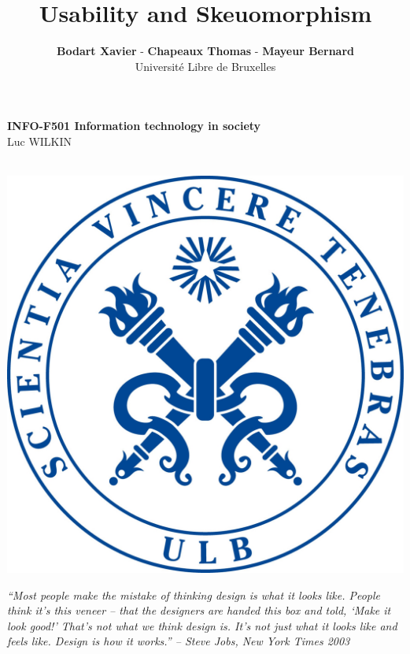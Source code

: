 \documentclass[a4paper,11pt] {article}
\theoremstyle{definition}
\begin{document}
\title{\textbf{Usability and Skeuomorphism}}
\author{\textbf{Bodart Xavier} - \textbf{Chapeaux Thomas} - \textbf{Mayeur Bernard} \\
Université Libre de Bruxelles}

\maketitle
\begin{center}

\textbf{INFO-F501 Information technology in society} \\
Luc WILKIN
\end{center}
\begin{center}

~\\

\includegraphics[scale=0.15]{fig-report/ULBjea.jpg}
\end{center}

\begin{center}
\textit{“Most people make the mistake of thinking design is what it looks like. People think it’s this veneer – that the designers are handed this box and told, ‘Make it look good!’ That’s not what we think design is. It’s not just what it looks like and feels like. Design is how it works.” – Steve Jobs, New York Times 2003
\\}
\end{center}
\pagebreak
\tableofcontents
\pagebreak
\end{document}
